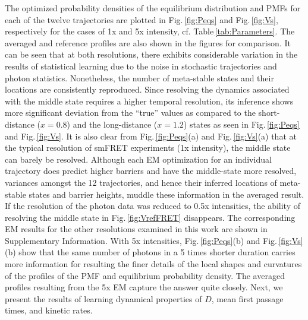 \documentclass[journal=jpcbfk,manuscript=article,layout=twocolumn,articletitle=true]{achemso}
\begin{document}
The optimized probability densities of the equilibrium distribution and PMFs for each of the twelve trajectories are plotted in Fig.\,\ref{fig:Peqs} and Fig.\,\ref{fig:Vs}, respectively for the cases of 1x and 5x intensity, cf. Table\,\ref{tab:Parameters}. The averaged and reference profiles are also shown in the figures for comparison. It can be seen that at both resolutions, there exhibits considerable variation in the results of statistical learning due to the noise in stochastic trajectories and photon statistics. Nonetheless, the number of meta-stable states and their locations are consistently reproduced. Since resolving the dynamics associated with the middle state requires a higher temporal resolution, its inference shows more significant deviation from the ``true'' values as compared to the short-distance ($x=0.8$) and the long-distance ($x=1.2$) states as seen in Fig.\,\ref{fig:Peqs} and Fig.\,\ref{fig:Vs}. It is also clear from Fig.\,\ref{fig:Peqs}(a) and Fig.\,\ref{fig:Vs}(a) that at the typical resolution of smFRET experiments (1x intensity), the middle state can barely be resolved. Although each EM optimization for an individual trajectory does predict higher barriers and have the middle-state more resolved, variances amongst the 12 trajectories, and hence their inferred locations of meta-stable states and barrier heights, muddle these information in the averaged result. If the resolution of the photon data was reduced to 0.5x intensities, the ability of resolving the middle state in Fig.\,\ref{fig:VrefFRET} disappears. The corresponding EM results for the other resolutions examined in this work are shown in Supplementary Information. With 5x intensities, Fig.\,\ref{fig:Peqs}(b) and Fig.\,\ref{fig:Vs}(b) show that the same number of photons in a 5 times shorter duration carries more information for resulting the finer details of the local shapes and curvatures of the profiles of the PMF and equilibrium probability density. The averaged profiles resulting from the 5x EM capture the answer quite closely. Next, we present the results of learning dynamical properties of $D$, mean first passage times, and kinetic rates. 
\end{document}
